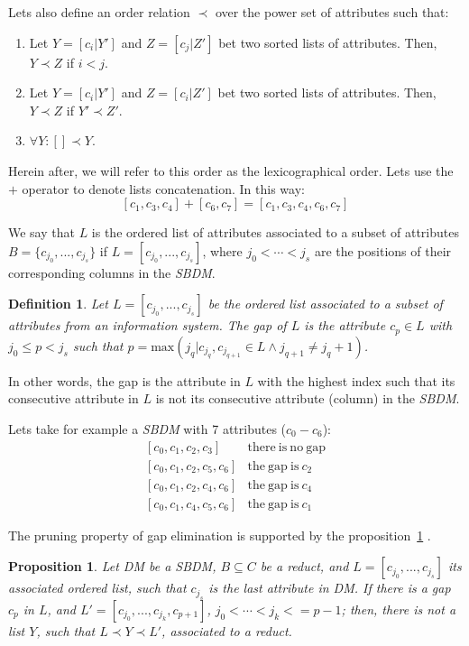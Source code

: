 \documentclass[number,preprint,review,12pt]{elsarticle}
\newtheorem{proposition}{Proposition}
\newtheorem{definition}{Definition}
\begin{document}
	Lets also define an order relation $\prec$ over the power set of attributes such that:
	\begin{enumerate}
		\item Let $Y=[c_i|Y']$ and $Z=[c_j|Z']$ bet two sorted lists of attributes. Then, $Y \prec Z$ if $i<j$.
		\item Let $Y=[c_i|Y']$ and $Z=[c_i|Z']$ bet two sorted lists of attributes. Then, $Y \prec Z$ if $Y' \prec Z'$.
		\item $\forall Y:  [] \prec Y$.
	\end{enumerate}
	Herein after, we will refer to this order as the lexicographical order. Lets use the $+$ operator to denote lists concatenation. In this way: $$[c_1,c_3,c_4]+[c_6,c_7]=[c_1,c_3,c_4,c_6,c_7]$$
		
	We say that $L$ is the ordered list of attributes associated to a subset of attributes $B = \lbrace c_{j_0},...,c_{j_s} \rbrace$ if $L = [c_{j_0},...,c_{j_s}]$, where $j_0<\cdots <j_s$ are the positions of their corresponding columns in the \textit{SBDM}.
	
	\begin{definition}\label{def:gap}
		Let $L = [c_{j_0},...,c_{j_s}]$ be the ordered list associated to a subset of attributes from an information system. The gap of $L$ is the attribute $c_p \in L$ with $j_0 \leq p <	j_s$ such that $p=\mathrm{max}(j_q | c_{j_q},c_{j_{q+1}} \in L \wedge j_{q+1} \neq j_q+1)$.
	\end{definition}
	
	In other words, the gap is the attribute in $L$ with the highest index such that its consecutive attribute in $L$ is not its consecutive attribute (column) in the \textit{SBDM}.
	
	Lets take for example a \textit{SBDM} with 7 attributes ($c_0 - c_6$):
	$$\begin{array}{ll}
	{[c_0,c_1,c_2,c_3]} 		& \mathrm{there~is~no~gap}\\
	{[c_0,c_1,c_2,c_5,c_6]} 	& \mathrm{the~gap~is~} c_2\\
	{[c_0,c_1,c_2,c_4,c_6]} 	& \mathrm{the~gap~is~} c_4\\
	{[c_0,c_1,c_4,c_5,c_6]} 	& \mathrm{the~gap~is~} c_1
	\end{array}$$


	The pruning property of gap elimination is supported by the proposition~\ref{prop:gap} \citep{Santiesteban03}. 
		
	\begin{proposition}\label{prop:gap} 
		Let DM be a SBDM, $B \subseteq C$ be a reduct, and $L = [c_{j_0},...,c_{j_s}]$ its associated ordered list, such that $c_{j_s}$ is the last attribute in DM. If there is a gap $c_p$ in $L$, and $L' = [c_{j_0},...,c_{j_k},c_{p+1}]$, $j_0<\cdots <j_k<=p-1$; then, there is not a list $Y$, such that $L \prec Y \prec L'$, associated to a reduct.
	\end{proposition}	
	
\end{document}
